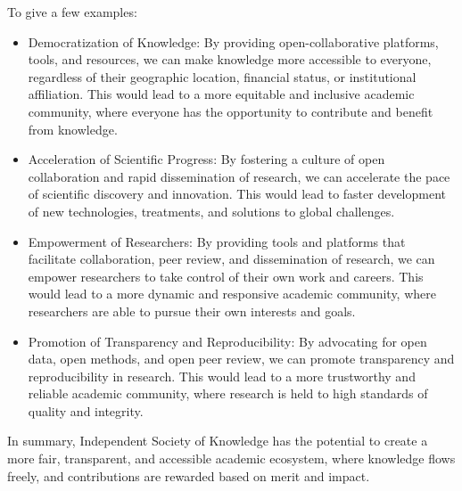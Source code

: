 To give a few examples:
\begin{itemize}
    \item Democratization of Knowledge: By providing open-collaborative platforms, tools, and resources, we can make knowledge more accessible to everyone, regardless of their geographic location, financial status, or institutional affiliation.
    This would lead to a more equitable and inclusive academic community, where everyone has the opportunity to contribute and benefit from knowledge.
    \item Acceleration of Scientific Progress: By fostering a culture of open collaboration and rapid dissemination of research, we can accelerate the pace of scientific discovery and innovation.
    This would lead to faster development of new technologies, treatments, and solutions to global challenges.
    \item Empowerment of Researchers: By providing tools and platforms that facilitate collaboration, peer review, and dissemination of research, we can empower researchers to take control of their own work and careers.
    This would lead to a more dynamic and responsive academic community, where researchers are able to pursue their own interests and goals.
    \item Promotion of Transparency and Reproducibility: By advocating for open data, open methods, and open peer review, we can promote transparency and reproducibility in research.
    This would lead to a more trustworthy and reliable academic community, where research is held to high standards of quality and integrity.
\end{itemize}
In summary, Independent Society of Knowledge has the potential to create a more fair, transparent, and accessible academic ecosystem, where knowledge flows freely, and contributions are rewarded based on merit and impact.
